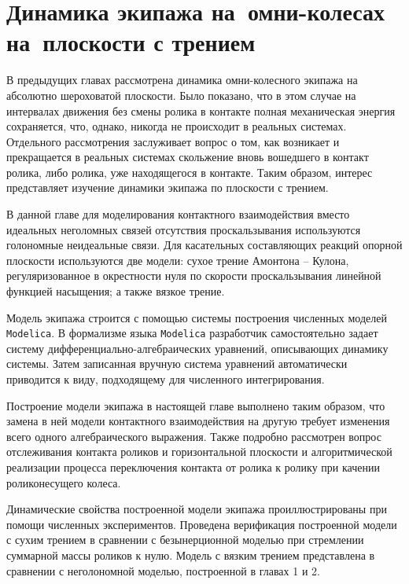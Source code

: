 \chapter{Динамика экипажа на~омни-колесах на~плоскости с трением}


В предыдущих главах рассмотрена динамика омни-колесного экипажа на абсолютно шероховатой плоскости. Было показано, что в этом случае на интервалах движения без смены ролика в контакте полная механическая энергия сохраняется, что, однако, никогда не происходит в реальных системах.
Отдельного рассмотрения заслуживает вопрос о том, как возникает и прекращается в реальных системах скольжение вновь вошедшего в контакт ролика, либо ролика, уже находящегося в контакте.
Таким образом, интерес представляет изучение динамики экипажа по плоскости с трением.

В данной главе для моделирования контактного взаимодействия вместо идеальных неголомных связей отсутствия проскальзывания используются голономные неидеальные связи. Для касательных составляющих реакций опорной плоскости используются две модели: сухое трение Амонтона -- Кулона, регуляризованное в окрестности нуля по скорости проскальзывания линейной функцией насыщения; а также вязкое трение.

Модель экипажа строится с помощью системы построения численных моделей \texttt{Modelica}. В формализме языка \texttt{Modelica} разработчик самостоятельно задает систему дифференциально-алгебраи\-чес\-ких уравнений, описывающих динамику системы. Затем записанная вручную система уравнений автоматически приводится к виду, подходящему для численного интегрирования.

Построение модели экипажа в настоящей главе выполнено таким образом, что замена в ней модели контактного взаимодействия на другую требует изменения всего одного алгебраического выражения. Также подробно рассмотрен вопрос отслеживания контакта роликов и горизонтальной плоскости и алгоритмической реализации процесса переключения контакта от ролика к ролику при качении  роликонесущего колеса.

Динамические свойства построенной модели экипажа проиллюстрированы при помощи численных экспериментов. Проведена верификация построенной модели с сухим трением в сравнении с безынерционной моделью при стремлении суммарной массы роликов к нулю. Модель с вязким трением представлена в сравнении с неголономной моделью, построенной в главах 1 и 2.